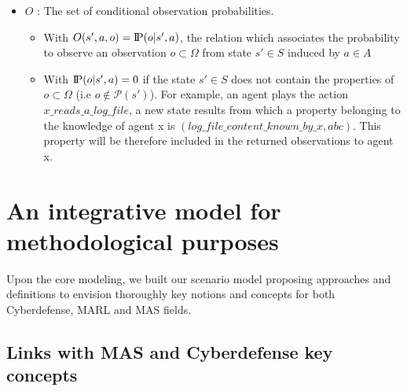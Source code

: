 \documentclass[conference]{IEEEtran}
\newcommand{\probP}{\text{I\kern-0.15em P}}
\begin{document}
\begin{itemize}
    \item $O$ : The set of conditional observation probabilities.
          \begin{itemize}
              \item With $O(s',a,o) = \probP(o|s',a)$, the relation which associates the probability to observe an observation $o \subset \Omega$ from state $s' \in S$ induced by $a \in A$
              \item With $\probP(o|s',a) = 0$ if the state $s' \in S$ does not contain the properties of $o \subset \Omega$ (i.e $o \not\in \mathcal{P}(s')$). For example, an agent plays the action $x\_reads\_a\_log\_file$, a new state results from which a property belonging to the knowledge of agent x is $(log\_file\_content\_known\_by\_x, \allowbreak abc)$. This property will be therefore included in the returned observations to agent x.
          \end{itemize}

\end{itemize}


\section{An integrative model for methodological purposes}

Upon the core modeling, we built our scenario model proposing approaches and definitions to envision thoroughly key notions and concepts for both Cyberdefense, MARL and MAS fields.

\subsection{Links with MAS and Cyberdefense key concepts}
\end{document}
